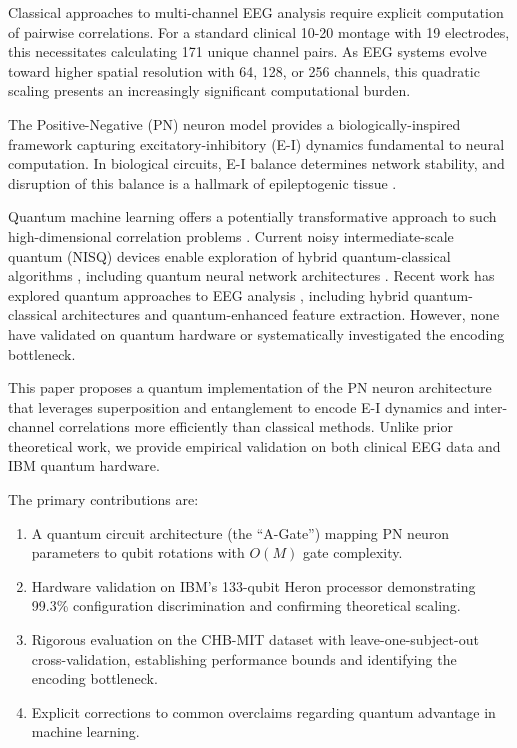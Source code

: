 \documentclass[pdflatex,sn-mathphys-num]{sn-jnl}
\begin{document}
Classical approaches to multi-channel EEG analysis require explicit computation of pairwise correlations. For a standard clinical 10-20 montage with 19 electrodes, this necessitates calculating 171 unique channel pairs. As EEG systems evolve toward higher spatial resolution with 64, 128, or 256 channels, this quadratic scaling presents an increasingly significant computational burden.

The Positive-Negative (PN) neuron model \cite{gupta2003} provides a biologically-inspired framework capturing excitatory-inhibitory (E-I) dynamics fundamental to neural computation. In biological circuits, E-I balance determines network stability, and disruption of this balance is a hallmark of epileptogenic tissue \cite{buzsaki2012}.

Quantum machine learning offers a potentially transformative approach to such high-dimensional correlation problems \cite{biamonte2017}. Current noisy intermediate-scale quantum (NISQ) devices \cite{preskill2018} enable exploration of hybrid quantum-classical algorithms \cite{cerezo2021}, including quantum neural network architectures \cite{farhi2018,abbas2021}. Recent work has explored quantum approaches to EEG analysis \cite{gandhi2014,chen2024qeegnet,olvera2024}, including hybrid quantum-classical architectures and quantum-enhanced feature extraction. However, none have validated on quantum hardware or systematically investigated the encoding bottleneck.

This paper proposes a quantum implementation of the PN neuron architecture that leverages superposition and entanglement to encode E-I dynamics and inter-channel correlations more efficiently than classical methods. Unlike prior theoretical work, we provide empirical validation on both clinical EEG data and IBM quantum hardware.

The primary contributions are:
\begin{enumerate}
    \item A quantum circuit architecture (the ``A-Gate'') mapping PN neuron parameters to qubit rotations with $O(M)$ gate complexity.
    \item Hardware validation on IBM's 133-qubit Heron processor demonstrating 99.3\% configuration discrimination and confirming theoretical scaling.
    \item Rigorous evaluation on the CHB-MIT dataset with leave-one-subject-out cross-validation, establishing performance bounds and identifying the encoding bottleneck.
    \item Explicit corrections to common overclaims regarding quantum advantage in machine learning.
\end{enumerate}
\end{document}
